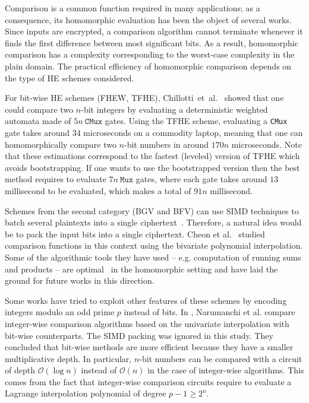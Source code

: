 Comparison is a common function required in many applications; as a consequence, its homomorphic evaluation has been the object of several works.
Since inputs are encrypted, a comparison algorithm cannot terminate whenever it finds the first difference between most significant bits. 
As a result, homomorphic comparison has a complexity corresponding to the worst-case complexity in the plain domain. 
The practical efficiency of homomorphic comparison depends on the type of HE schemes considered.

For bit-wise HE schemes (FHEW, TFHE), Chillotti~et~al.~\cite{AC:CGGI17,JC:CGGI20} showed that one could compare two $n$-bit integers by evaluating a deterministic weighted automata made of $5n~\texttt{CMux}$ gates. 
Using the TFHE scheme, evaluating a \texttt{CMux} gate takes around $34$ microseconds on a commodity laptop, meaning that one can homomorphically compare two $n$-bit numbers in around $170n$ microseconds. 
Note that these estimations correspond to the fastest (leveled) version of TFHE which avoids bootstrapping. 
If one wants to use the bootstrapped version then the best method requires to evaluate $7n~\texttt{Mux}$ gates, where each gate takes around $13$ millisecond to be evaluated, which makes a total of $91n$ millisecond.

Schemes from the second category (BGV and BFV) can use \ac{SIMD} techniques to batch several plaintexts into a single ciphertext~\cite{SV14}. 
Therefore, a natural idea would be to pack the input bits into a single ciphertext. 
Cheon et al.~\cite{CKK15,CKK16} studied comparison functions in this context using the bivariate polynomial interpolation. 
Some of the algorithmic tools they have used -- e.g. computation of running sums and products -- are optimal~ in the homomorphic setting and have laid the ground for future works in this direction.

Some works have tried to exploit other features of these schemes by encoding integers modulo an odd prime $p$ instead of bits. 
In \cite{NGEG17}, Narumanchi et al. compare integer-wise comparison algorithms based on the univariate interpolation with bit-wise counterparts.
The SIMD packing was ignored in this study.
They concluded that bit-wise methods are more efficient because they have a smaller multiplicative depth.
In particular, $n$-bit numbers can be compared with a circuit of depth $\mathcal{O}(\log n)$ instead of $\mathcal{O}(n)$ in the case of integer-wise algorithms.
This comes from the fact that integer-wise comparison circuits require to evaluate a Lagrange interpolation polynomial of degree $p-1 \geq 2^n$.


